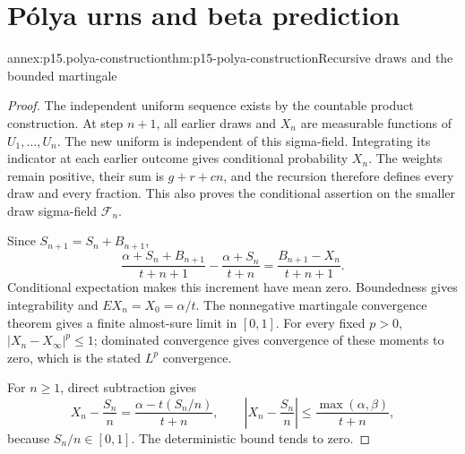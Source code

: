 \section{P\'olya urns and beta prediction}
\label{sec:annex-p15-polya-urns}

\begin{annexitem}{annex:p15.polya-construction}{thm:p15-polya-construction}{Recursive draws and the bounded martingale}
\begin{proof}
The independent uniform sequence exists by the countable product
construction. At step \(n+1\), all earlier draws and \(X_n\) are
measurable functions of \(U_1,\ldots,U_n\).
The new uniform is independent of this sigma-field. Integrating its
indicator at each earlier outcome gives conditional probability \(X_n\).
The weights remain positive, their sum is \(g+r+cn\), and the recursion
therefore defines every draw and every fraction.
This also proves the conditional assertion on the smaller draw
sigma-field \(\mathcal F_n\).

Since \(S_{n+1}=S_n+B_{n+1}\),
\[
 \frac{\alpha+S_n+B_{n+1}}{t+n+1}
       -\frac{\alpha+S_n}{t+n}
             =\frac{B_{n+1}-X_n}{t+n+1}.
\]
Conditional expectation makes this increment have mean zero.
Boundedness gives integrability and \(EX_n=X_0=\alpha/t\).
The nonnegative martingale convergence theorem gives a finite
almost-sure limit in \([0,1]\).
For every fixed \(p>0\), \(|X_n-X_\infty|^p\leq1\);
dominated convergence gives convergence of these moments to zero,
which is the stated \(L^p\) convergence.

For \(n\geq1\), direct subtraction gives
\[
 X_n-\frac{S_n}{n}
       =\frac{\alpha-t(S_n/n)}{t+n},\qquad
 \left|X_n-\frac{S_n}{n}\right|
             \leq\frac{\max(\alpha,\beta)}{t+n},
\]
because \(S_n/n\in[0,1]\). The deterministic bound tends to zero.
\end{proof}
\end{annexitem}

